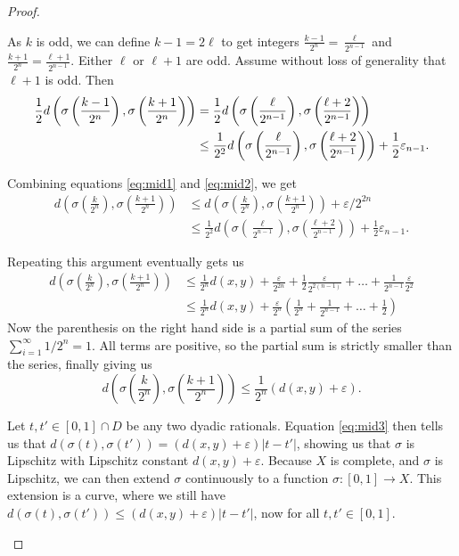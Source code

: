 \documentclass[11pt, a4paper, oneside]{memoir}
\theoremstyle{plain}\newtheorem{theorem}[subsection]{Theorem}
\theoremstyle{definition}
\begin{document}
\begin{proof}
\begin{enumerate}
As \(k\) is odd, we can define \(k-1=2\ell\) to get integers \(\frac{k-1}{2^n}=\frac{\ell}{2^{n-1}}\) and \(\frac{k+1}{2^{n}}=\frac{\ell+1}{2^{n-1}}\).
Either \(\ell\) or \(\ell+1\) are odd.
Assume without loss of generality that \(\ell+1\) is odd.
Then
\begin{align*}
\frac{1}{2}d\left(\sigma\left(\frac{k-1}{2^n}\right),\sigma\left(\frac{k+1}{2^n}\right)\right)
    &=\frac{1}{2}d\left(\sigma\left(\frac{\ell}{2^{n-1}}\right),\sigma\left(\frac{\ell+2}{2^{n-1}}\right)\right)\label{eq:mid2}\\
    &\leq \frac{1}{2^2}d\left(\sigma\left(\frac{\ell}{2^{n-1}}\right),\sigma\left(\frac{\ell+2}{2^{n-1}}\right)\right)+\frac{1}{2}\varepsilon_{n-1}.\notag
\end{align*}

Combining equations \eqref{eq:mid1} and \eqref{eq:mid2}, we get
\begin{align}d\left(\sigma\left(\frac{k}{2^n}\right),\sigma\left(\frac{k+1}{2^n}\right)\right)
&\leq d\left(\sigma\left(\frac{k}{2^n}\right),\sigma\left(\frac{k+1}{2^n}\right)\right)+\varepsilon/2^{2n}\\
&\leq \frac{1}{2^2}d\left(\sigma\left(\frac{\ell}{2^{n-1}}\right),\sigma\left(\frac{\ell+2}{2^{n-1}}\right)\right)+\frac{1}{2}\varepsilon_{n-1}.
\end{align}

Repeating this argument eventually gets us
\begin{align*}
d\left(\sigma\left(\frac{k}{2^n}\right),\sigma\left(\frac{k+1}{2^n}\right)\right)
&\leq \frac{1}{2^n}d(x,y)+\frac{\varepsilon}{2^{2n}}+\frac{1}{2}\frac{\varepsilon}{2^{2(n-1)}}+\ldots+\frac{1}{2^{n-1}}\frac{\varepsilon}{2^2}\\
&\leq \frac{1}{2^n}d(x,y)+\frac{\varepsilon}{2^n}\left(\frac{1}{2^n}+\frac{1}{2^{n-1}}+\ldots+\frac{1}{2}\right)
\end{align*}
Now the parenthesis on the right hand side is a partial sum of the series \(\sum_{i=1}^\infty 1/2^n=1\).
All terms are positive, so the partial sum is strictly smaller than the series, finally giving us
\begin{equation}
d\left(\sigma\left(\frac{k}{2^n}\right),\sigma\left(\frac{k+1}{2^n}\right)\right)\leq 
\frac{1}{2^n}(d(x,y)+\varepsilon)\label{eq:mid3}.    
\end{equation}

Let \(t,t'\in [0,1]\cap D\) be any two dyadic rationals.
Equation \eqref{eq:mid3} then tells us that \(d(\sigma(t),\sigma(t'))=(d(x,y)+\varepsilon)|t-t'|\), showing us that \(\sigma\) is Lipschitz with Lipschitz constant \(d(x,y)+\varepsilon\).
Because \(X\) is complete, and \(\sigma\) is Lipschitz, we can then extend \(\sigma\) continuously to a function \(\sigma:[0,1]\to X\). 
This extension is a curve, where we still have \(d(\sigma(t),\sigma(t'))\leq (d(x,y)+\varepsilon)|t-t'|\), now for all \(t,t'\in [0,1]\).


\end{enumerate}
\end{proof}
\end{document}
